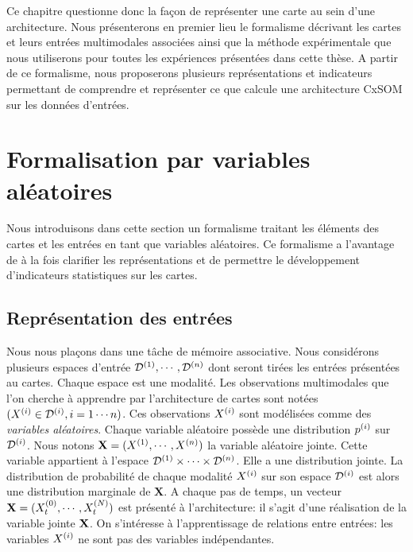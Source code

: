 Ce chapitre questionne donc la façon de représenter une carte au sein d'une architecture. Nous présenterons en premier lieu le formalisme décrivant les cartes et leurs entrées multimodales associées ainsi que la méthode expérimentale que nous utiliserons pour toutes les expériences présentées dans cette thèse. A partir de ce formalisme, nous proposerons plusieurs représentations et indicateurs permettant de comprendre et représenter ce que calcule une architecture CxSOM sur les données d'entrées.

\section{Formalisation par variables aléatoires}

Nous introduisons dans cette section un formalisme traitant les éléments des cartes et les entrées en tant que variables aléatoires. 
Ce formalisme a l'avantage de à la fois clarifier les représentations et de permettre le développement d'indicateurs statistiques sur les cartes.

\subsection{Représentation des entrées}

Nous nous plaçons dans une tâche de mémoire associative. 
Nous considérons plusieurs espaces d'entrée $\mathcal{D}^{({1})},\cdots,\mathcal{D}^{({n})}$ dont seront tirées les entrées présentées au cartes. Chaque espace est une modalité.
Les observations multimodales que l'on cherche à apprendre par l'architecture de cartes sont notées $(X^{({i})} \in \mathcal{D}^{({i})}, i = 1 \cdots n)$. Ces observations $X^{({i})}$ sont modélisées comme des \emph{variables aléatoires}. Chaque variable aléatoire possède une distribution $p^{({i})}$ sur $\mathcal{D}^{({i})}$.
Nous notons $\mathbf{X} = (X^{({1})}, \cdots, X^{({n})})$ la variable aléatoire jointe. Cette variable appartient à l'espace $\mathcal{D}^{({1})} \times \cdots \times \mathcal{D}^{({n})}$. Elle a une distribution jointe. La distribution de probabilité de chaque modalité $X^{({i})}$ sur son espace $\mathcal{D}^{({i})}$ est alors une distribution marginale de $\mathbf{X}$.
A chaque pas de temps, un vecteur $\mathbf{X} = (X^{({0})}_t, \cdots , X^{({N})}_t)$ est présenté à l'architecture: il s'agit d'une réalisation de la variable jointe $\mathbf{X}$. On s'intéresse à l'apprentissage de relations entre entrées: les variables $X^{({i})}$ ne sont pas des variables indépendantes.

